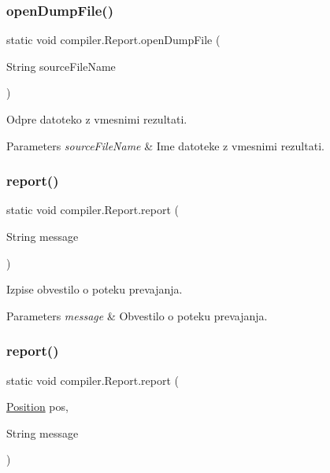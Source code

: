 \subsubsection{\texorpdfstring{open\+Dump\+File()}{openDumpFile()}}
{\footnotesize\ttfamily static void compiler.\+Report.\+open\+Dump\+File (\begin{DoxyParamCaption}\item[{String}]{source\+File\+Name }\end{DoxyParamCaption})\hspace{0.3cm}{\ttfamily [static]}}

Odpre datoteko z vmesnimi rezultati.


\begin{DoxyParams}{Parameters}
{\em source\+File\+Name} & Ime datoteke z vmesnimi rezultati. \\
\hline
\end{DoxyParams}
\mbox{\label{classcompiler_1_1_report_ad913b6bd4c1c19b97b79e3ceda6c9f62}} 
\subsubsection{\texorpdfstring{report()}{report()}\hspace{0.1cm}{\footnotesize\ttfamily [1/2]}}
{\footnotesize\ttfamily static void compiler.\+Report.\+report (\begin{DoxyParamCaption}\item[{String}]{message }\end{DoxyParamCaption})\hspace{0.3cm}{\ttfamily [static]}}

Izpise obvestilo o poteku prevajanja.


\begin{DoxyParams}{Parameters}
{\em message} & Obvestilo o poteku prevajanja. \\
\hline
\end{DoxyParams}
\mbox{\label{classcompiler_1_1_report_a2163c1c6dbc01e8987c0b4251f088e95}} 
\subsubsection{\texorpdfstring{report()}{report()}\hspace{0.1cm}{\footnotesize\ttfamily [2/2]}}
{\footnotesize\ttfamily static void compiler.\+Report.\+report (\begin{DoxyParamCaption}\item[{\hyperlink{classcompiler_1_1_position}{Position}}]{pos,  }\item[{String}]{message }\end{DoxyParamCaption})\hspace{0.3cm}{\ttfamily [static]}}

